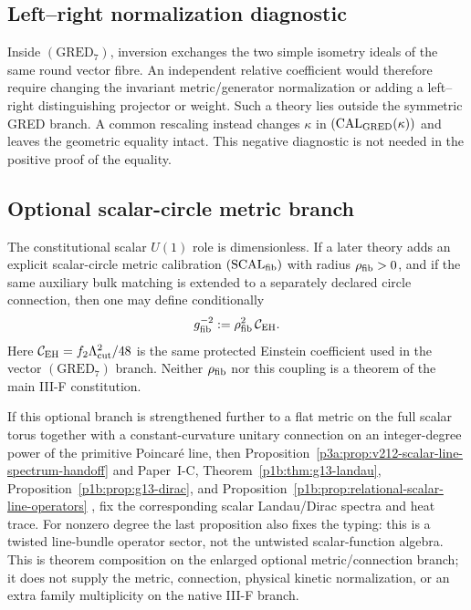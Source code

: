 \documentclass[11pt,a4paper]{article}
\begin{document}
\subsection{Left--right normalization diagnostic}
\label{p3f:app:lr-diagnostic}
Inside \((\mathrm{GRED}_7)\), inversion exchanges the two simple isometry ideals
of the same round vector fibre.  An independent relative coefficient would
therefore require changing the invariant metric/generator normalization or
adding a left--right distinguishing projector or weight.  Such a theory lies
outside the symmetric GRED branch.  A common rescaling instead changes
\(\kappa\) in \((\mathrm{CAL}_{\rm GRED}(\kappa))\) and leaves the geometric
equality intact.  This negative diagnostic is not needed in the positive proof
of the equality.

\subsection{Optional scalar-circle metric branch}
\label{p3f:app:scalar-circle-metric}
The constitutional scalar \(U(1)\) role is dimensionless.  If a later theory
adds an explicit scalar-circle metric calibration \((\mathrm{SCAL}_{\rm fib})\)
with radius \(\rho_{\rm fib}>0\), and if the same auxiliary bulk matching is
extended to a separately declared circle connection, then one may define conditionally
\[
 g_{\rm fib}^{-2}:=\rho_{\rm fib}^2\,\mathcal C_{\rm EH}.
\]
Here \(\mathcal C_{\rm EH}=f_2\Lambda_{\rm cut}^2/48\) is the same
protected Einstein coefficient used in the vector \((\mathrm{GRED}_7)\)
branch.  Neither
\(\rho_{\rm fib}\) nor this coupling is a theorem of the main III-F
constitution.

If this optional branch is strengthened further to a flat metric on the full
scalar torus together with a constant-curvature unitary connection on an
integer-degree power of the primitive Poincar\'e line, then
Proposition~\ref{p3a:prop:v212-scalar-line-spectrum-handoff} and Paper~I-C,
Theorem~\ref{p1b:thm:g13-landau},
Proposition~\ref{p1b:prop:g13-dirac}, and
Proposition~\ref{p1b:prop:relational-scalar-line-operators}
\cite{Kugelmann2026Paper1C}, fix the corresponding scalar Landau/Dirac
spectra and heat trace.  For nonzero degree the last proposition also fixes
the typing: this is a twisted line-bundle operator sector, not the untwisted
scalar-function algebra.  This is theorem composition on the enlarged
optional metric/connection branch; it does not supply the metric, connection,
physical kinetic normalization, or an extra family multiplicity on the native
III-F branch.
\end{document}

